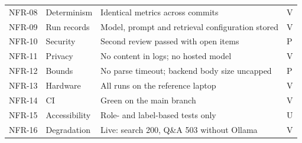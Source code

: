 {\begin{longtable}{@{}p{1.25cm}p{4.0cm}p{6.6cm}p{0.6cm}@{}}
  NFR-08 & Determinism & Identical metrics across commits & V \\
  NFR-09 & Run records & Model, prompt and retrieval configuration stored & V \\
  NFR-10 & Security & Second review passed with open items & P \\
  NFR-11 & Privacy & No content in logs; no hosted model & V \\
  NFR-12 & Bounds & No parse timeout; backend body size uncapped & P \\
  NFR-13 & Hardware & All runs on the reference laptop & V \\
  NFR-14 & CI & Green on the main branch & V \\
  NFR-15 & Accessibility & Role- and label-based tests only & U \\
  NFR-16 & Degradation & Live: search 200, Q\&A 503 without Ollama & V \\
  \bottomrule
\end{longtable}
}
